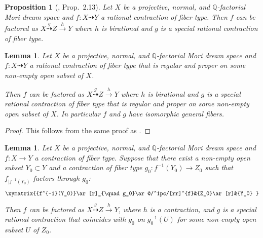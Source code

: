 \documentclass[a4paper,12pt]{amsart}
\newtheorem{lemma}[thm]{Lemma}
\newtheorem{proposition}[thm]{Proposition}
\theoremstyle{definition}
\numberwithin{figure}{section}
\numberwithin{table}{section}
\newcommand{\Q}{\mathbb{Q}}
\begin{document}
\begin{proposition}[\cite{fibrations}, Prop.~2.13]\label{calanques}
 Let $X$ be a projective, normal, and $\Q$-factorial Mori dream space and $f\colon X\dasharrow Y$ a rational contraction of fiber type. 
Then $f$ can be factored as $X\stackrel{g}{\dasharrow} Z\stackrel{h}{\to}Y$ where  $h$ is birational and $g$ is a special rational contraction of fiber type.
\end{proposition}  
\begin{lemma}\label{properfiber}
  Let $X$ be a projective, normal, and $\Q$-factorial Mori dream space and $f\colon X\dasharrow Y$ a rational contraction of fiber type  that
 is regular and proper on some non-empty open subset of $X$.

  Then $f$ can be factored as $X\stackrel{g}{\dasharrow} Z\stackrel{h}{\to}Y$ where $h$ is birational and $g$ is a special rational contraction of fiber type 
  that is regular and proper on some non-empty open subset of $X$. In particular $f$ and $g$ have isomorphic general fibers.
\end{lemma}  
\begin{proof}
This follows from the same proof as \cite[Prop.~2.13]{fibrations}.
\end{proof}  
\begin{lemma}\label{induced}
  Let $X$ be a projective, normal, and $\Q$-factorial Mori dream space and $f\colon X\to Y$ a contraction of fiber type. Suppose that there exist a non-empty open subset $Y_0\subset Y$ and a contraction of fiber type $g_0\colon f^{-1}(Y_0)\to Z_0$ such that $f_{|f^{-1}(Y_0)}$ factors through $g_0$:
$$\xymatrix{{f^{-1}(Y_0)}\ar[r]_{\quad g_0}\ar@/^1pc/[rr]^{f}&{Z_0}\ar[r]&{Y_0}
    }$$
 Then $f$ can be factored as $X\stackrel{g}{\dasharrow} Z\stackrel{h}{\to}Y$, where $h$ is a contraction, and $g$ is 
 a special rational contraction  that coincides with $g_0$ on
$g_0^{-1}(U)$ for
 some non-empty open subset $U$ of $Z_0$.
\end{lemma}
\end{document}
